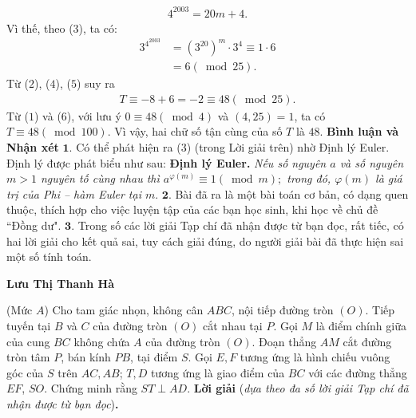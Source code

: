\begin{multicols}{2}
	\begin{align*}
		{4^{2003}} = 20m + 4.
	\end{align*}
	Vì thế, theo ($3$), ta có:
	\begin{align*}
		{3^{{4^{2003}}}} &= {\left( {{3^{20}}} \right)^m} \cdot {3^4} \equiv 1 \cdot 6 \\
		&= 6\left( {\bmod 25} \right). \tag{$5$}
	\end{align*}
	Từ ($2$), ($4$), ($5$) suy ra
	\begin{align*}
		T \equiv  - 8 + 6 =  - 2 \equiv 48\left( {\bmod 25} \right). \tag{$6$}
	\end{align*}
	Từ ($1$) và ($6$), với lưu ý $0 \equiv 48\left( {\bmod 4} \right)$ và $(4, 25) = 1$, ta có  $T \equiv 48\left( {\bmod 100} \right)$.
	\vskip 0.05cm
	Vì vậy, hai chữ số tận cùng của số $T$ là $48$.
	\vskip 0.05cm
	\columnbreak
	\textbf{\color{thachthuctoanhoc}Bình luận và Nhận xét}
	\vskip 0.05cm
	$\pmb{1.}$ Có thể phát hiện ra ($3$) (trong Lời giải trên) nhờ Định lý Euler. Định lý được phát biểu như sau:
	\vskip 0.05cm
	\textbf{\color{thachthuctoanhoc}Định lý Euler.} \textit{Nếu số nguyên $a$ và số nguyên $m > 1$ nguyên tố cùng nhau thì  ${a^{\varphi \left( m \right)}} \equiv 1\left( {\bmod m} \right);$ trong đó, $\varphi \left( m \right)$  là giá trị của Phi -- hàm Euler tại $m$}.
	\vskip 0.05cm
	$\pmb{2.}$ Bài đã ra là một bài toán cơ bản, có dạng quen thuộc, thích hợp cho việc luyện tập của các bạn học sinh, khi học về chủ đề ``Đồng dư".
	\vskip 0.05cm
	$\pmb{3.}$ Trong số các lời giải Tạp chí đã nhận được từ bạn đọc, rất tiếc, có hai lời giải cho kết quả sai, tuy cách giải đúng, do người giải bài đã thực hiện sai một số tính toán.
	\begin{flushright}
		\textbf{\color{thachthuctoanhoc}Lưu Thị Thanh Hà}
	\end{flushright}
	{}
	(Mức $A$) Cho tam giác nhọn, không cân $A B C$, nội tiếp đường tròn $(O)$. Tiếp tuyến tại $B$ và $C$ của đường tròn $(O)$ cắt nhau tại $P$. Gọi $M$ là điểm chính giữa của cung $B C$ không chứa $A$ của đường tròn $(O)$. Đoạn thẳng $A M$ cắt đường tròn tâm $P$, bán kính $P B$, tại điểm $S$. Gọi $E, F$ tương ứng là hình chiếu vuông góc của $S$ trên $A C, A B$; $T, D$ tương ứng là giao điểm của $B C$ với các đường thẳng $E F$, $SO$.  Chứng minh rằng $ST \perp A D$.
	\vskip 0.05cm
	\textbf{\color{thachthuctoanhoc}Lời giải} (\textit{dựa theo đa số lời giải Tạp chí đã nhận được từ bạn đọc})\textbf{\color{thachthuctoanhoc}.}
	\begin{figure}[H]

\end{figure}
\end{multicols}
